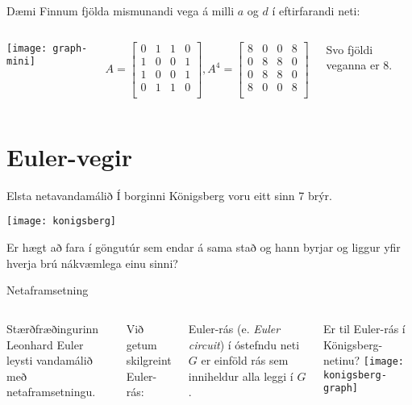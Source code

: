 \documentclass{beamer}
\begin{document}
\begin{frame}{Dæmi}
Finnum fjölda mismunandi vega á milli $a$ og $d$ í eftirfarandi neti:
\begin{columns}
\begin{center}
\texttt{[image: graph-mini]}
\end{center}
\[
A =
\begin{bmatrix}
0&1&1&0\\
1&0&0&1\\
1&0&0&1\\
0&1&1&0\\
\end{bmatrix}
,
A^4 =
\begin{bmatrix}
8&0&0&8\\
0&8&8&0\\
0&8&8&0\\
8&0&0&8\\
\end{bmatrix}
\]
\begin{center}
Svo fjöldi veganna er 8.
\end{center}
\end{columns}
\end{frame}

\section{Euler-vegir}

\begin{frame}{Elsta netavandamálið}
Í borginni Königsberg voru eitt sinn 7 brýr.
\begin{center}
\texttt{[image: konigsberg]}
\end{center}
Er hægt að fara í göngutúr sem endar á sama stað og hann byrjar og liggur yfir hverja brú nákvæmlega einu sinni?
\end{frame}

\begin{frame}{Netaframsetning}
\begin{columns}
Stærðfræðingurinn Leonhard Euler leysti vandamálið með netaframsetningu.

Við getum skilgreint Euler-rás:

\begin{tcolorbox}[title=Euler-rás]
Euler-rás (e. \emph{Euler circuit}) í óstefndu neti $G$ er einföld rás sem inniheldur alla leggi í $G$.
\end{tcolorbox}
Er til Euler-rás í Königsberg-netinu?
\texttt{[image: konigsberg-graph]}
\end{columns}
\end{frame}
\end{document}
